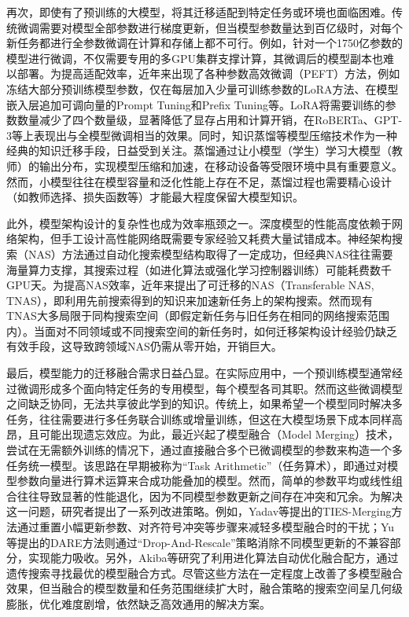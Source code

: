 \documentclass[../main.tex]{subfiles}
\begin{document}
再次，即使有了预训练的大模型，将其迁移适配到特定任务或环境也面临困难。传统微调需要对模型全部参数进行梯度更新，但当模型参数量达到百亿级时，对每个新任务都进行全参数微调在计算和存储上都不可行。例如，针对一个1750亿参数的模型进行微调，不仅需要专用的多GPU集群支撑计算，其微调后的模型副本也难以部署。为提高适配效率，近年来出现了各种参数高效微调（PEFT）方法，例如冻结大部分预训练模型参数，仅在每层加入少量可训练参数的LoRA方法、在模型嵌入层追加可调向量的Prompt Tuning和Prefix Tuning等。LoRA将需要训练的参数数量减少了四个数量级，显著降低了显存占用和计算开销，在RoBERTa、GPT-3等上表现出与全模型微调相当的效果。同时，知识蒸馏等模型压缩技术作为一种经典的知识迁移手段，日益受到关注。蒸馏通过让小模型（学生）学习大模型（教师）的输出分布，实现模型压缩和加速，在移动设备等受限环境中具有重要意义。然而，小模型往往在模型容量和泛化性能上存在不足，蒸馏过程也需要精心设计（如教师选择、损失函数等）才能最大程度保留大模型知识。

此外，模型架构设计的复杂性也成为效率瓶颈之一。深度模型的性能高度依赖于网络架构，但手工设计高性能网络既需要专家经验又耗费大量试错成本。神经架构搜索（NAS）方法通过自动化搜索模型结构取得了一定成功，但经典NAS往往需要海量算力支撑，其搜索过程（如进化算法或强化学习控制器训练）可能耗费数千GPU天。为提高NAS效率，近年来提出了可迁移的NAS（Transferable NAS, TNAS），即利用先前搜索得到的知识来加速新任务上的架构搜索。然而现有TNAS大多局限于同构搜索空间（即假定新任务与旧任务在相同的网络搜索范围内）。当面对不同领域或不同搜索空间的新任务时，如何迁移架构设计经验仍缺乏有效手段，这导致跨领域NAS仍需从零开始，开销巨大。

最后，模型能力的迁移融合需求日益凸显。在实际应用中，一个预训练模型通常经过微调形成多个面向特定任务的专用模型，每个模型各司其职。然而这些微调模型之间缺乏协同，无法共享彼此学到的知识。传统上，如果希望一个模型同时解决多任务，往往需要进行多任务联合训练或增量训练，但这在大模型场景下成本同样高昂，且可能出现遗忘效应。为此，最近兴起了模型融合（Model Merging）技术，尝试在无需额外训练的情况下，通过直接融合多个已微调模型的参数来构造一个多任务统一模型。该思路在早期被称为“Task Arithmetic”（任务算术），即通过对模型参数向量进行算术运算来合成功能叠加的模型。然而，简单的参数平均或线性组合往往导致显著的性能退化，因为不同模型参数更新之间存在冲突和冗余。为解决这一问题，研究者提出了一系列改进策略。例如，Yadav等提出的TIES-Merging方法通过重置小幅更新参数、对齐符号冲突等步骤来减轻多模型融合时的干扰；Yu等提出的DARE方法则通过“Drop-And-Rescale”策略消除不同模型更新的不兼容部分，实现能力吸收。另外，Akiba等研究了利用进化算法自动优化融合配方，通过遗传搜索寻找最优的模型融合方式。尽管这些方法在一定程度上改善了多模型融合效果，但当融合的模型数量和任务范围继续扩大时，融合策略的搜索空间呈几何级膨胀，优化难度剧增，依然缺乏高效通用的解决方案。
\end{document}
